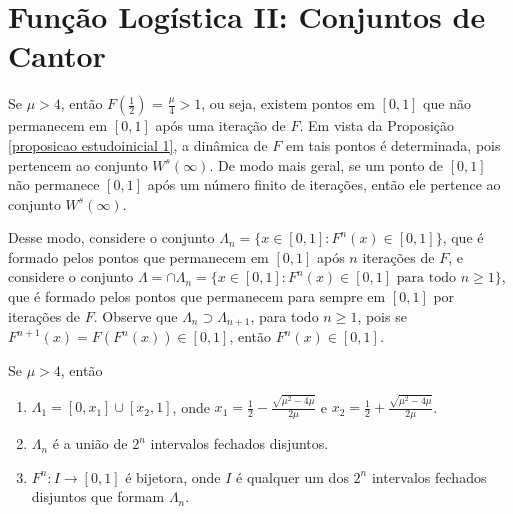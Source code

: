 
\section{Função Logística II: Conjuntos de Cantor}


Se $\mu > 4$, então $F\left(\frac{1}{2}\right)$ = $\frac{\mu}{4} > 1$, ou seja, existem pontos em $[0, 1]$ que não permanecem em $[0, 1]$ após uma iteração de $F$. Em vista da Proposição \ref{proposicao estudoinicial 1}, a dinâmica de $F$ em tais pontos é determinada, pois pertencem ao conjunto $W^s(\infty)$. De modo mais geral, se um ponto de $[0, 1]$ não permanece $[0, 1]$ após um número finito de iterações, então ele pertence ao conjunto $W^s(\infty)$. 

Desse modo, considere o conjunto $\Lambda_n = \{x \in [0, 1] : F^n(x) \in [0, 1]\}$, que é formado pelos pontos que permanecem em $[0, 1]$ após $n$ iterações de $F$, e considere o conjunto $\Lambda = \cap \Lambda_n = \{x \in [0, 1] : F^n(x) \in [0, 1] \textrm{ para todo } n \geq 1\}$, que é formado pelos pontos que permanecem para sempre em $[0, 1]$ por iterações de $F$. Observe que $\Lambda_n \supset \Lambda_{n+1}$, para todo $n \geq 1$, pois se $F^{n+1}(x) = F(F^n(x)) \in [0,1]$, então $F^n(x) \in [0,1]$.


\begin{proposition}
\label{proposicao conjuntosdecantor 1}
Se $\mu > 4$, então
\begin{enumerate}
\item $\Lambda_1 = [0, x_1] \cup [x_2, 1]$, onde $x_1 = \frac{1}{2} - \frac{\sqrt{\mu^2 - 4\mu}}{2\mu}$ e $x_2 = \frac{1}{2} + \frac{\sqrt{\mu^2 - 4\mu}}{2\mu}$.
\item $\Lambda_n$ é a união de $2^n$ intervalos fechados disjuntos.
\item $F^n: I \to [0, 1]$ é bijetora, onde $I$ é qualquer um dos $2^n$ intervalos fechados disjuntos que formam $\Lambda_n$.
\end{enumerate}
\end{proposition}

